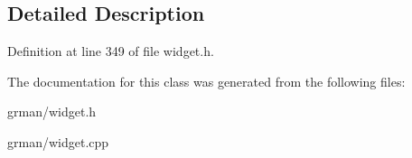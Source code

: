 \subsection{Detailed Description}


Definition at line 349 of file widget.\+h.



The documentation for this class was generated from the following files\+:\begin{DoxyCompactItemize}
\item 
grman/widget.\+h\item 
grman/widget.\+cpp\end{DoxyCompactItemize}
